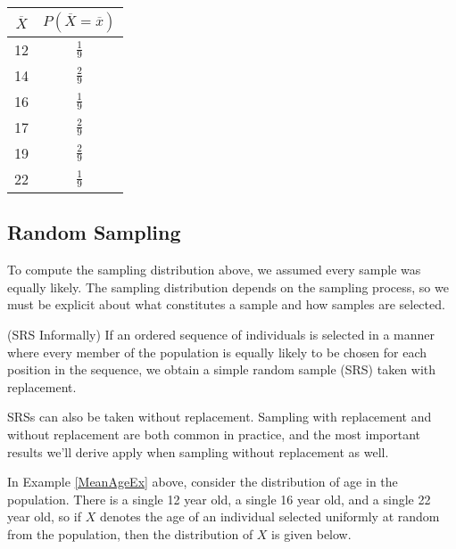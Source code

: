 \begin{examp}
\vspace{-1em}
\begin{center}
    \begin{minipage}{.45\textwidth}
        \centering
      \renewcommand*{\arraystretch}{1.35}
\begin{tabular}{c|c}
$\overline{X}$ & $P(\overline{X} = \overline{x})$ \\
\hline
12 & $\frac{1}{9}$ \\
14 & $\frac{2}{9}$ \\
16 & $\frac{1}{9}$ \\
17 & $\frac{2}{9}$ \\
19 & $\frac{2}{9}$ \\
22 & $\frac{1}{9}$
\end{tabular}
\renewcommand*{\arraystretch}{1}
\vspace{0.25em}
    \end{minipage}%
    \begin{minipage}{0.5\textwidth}
        \centering
{}
\end{minipage}
\end{center}
\end{examp}

\subsection*{Random Sampling}

To compute the sampling distribution above, we assumed every sample was equally likely. The sampling distribution depends on the sampling process, so we must be explicit about what constitutes a sample and how samples are selected.

\begin{defn} (SRS Informally) If an ordered sequence of individuals is selected in a manner where every member of the population is equally likely to be chosen for each position in the sequence, we obtain a simple random sample (SRS) taken with replacement.
\end{defn}
\rmk SRSs can also be taken without replacement. Sampling with replacement and without replacement are both common in practice, and the most important results we'll derive apply when sampling without replacement as well.
\par
In Example \ref{MeanAgeEx} above, consider the distribution of age in the population. There is a single 12 year old, a single 16 year old, and a single 22 year old, so if $X$ denotes the age of an individual selected uniformly at random from the population, then the distribution of $X$ is given below.

